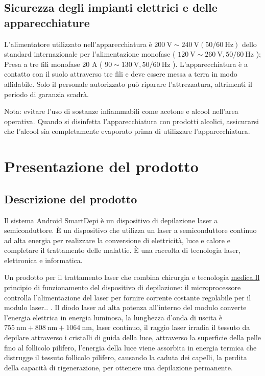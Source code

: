 \documentclass[10pt]{article}
\begin{document}
\subsection{Sicurezza degli impianti elettrici e delle apparecchiature}

L'alimentatore utilizzato nell'apparecchiatura è $200 \mathrm{~V} \sim 240 \mathrm{~V}(50 / 60 \mathrm{~Hz})$ dello standard internazionale per l'alimentazione monofase ( $120 \mathrm{~V} \sim 260 \mathrm{~V}, 50 / 60 \mathrm{~Hz}$ ); Presa a tre fili monofase 20 A ( $90 \sim 130 \mathrm{~V}, 50 / 60 \mathrm{~Hz}$ ). L'apparecchiatura è a contatto con il suolo attraverso tre fili e deve essere messa a terra in modo affidabile. Solo il personale autorizzato può riparare l'attrezzatura, altrimenti il periodo di garanzia scadrà.

Nota: evitare l'uso di sostanze infiammabili come acetone e alcool nell'area operativa. Quando si disinfetta l'apparecchiatura con prodotti alcolici, assicurarsi che l'alcool sia completamente evaporato prima di utilizzare l'apparecchiatura.

\section{Presentazione del prodotto}
\subsection{Descrizione del prodotto}
Il sistema Android SmartDepi è un dispositivo di depilazione laser a semiconduttore. È un dispositivo che utilizza un laser a semiconduttore continuo ad alta energia per realizzare la conversione di elettricità, luce e calore e completare il trattamento delle malattie. È una raccolta di tecnologia laser, elettronica e informatica.

Un prodotto per il trattamento laser che combina chirurgia e tecnologia \href{http://medica.Il}{medica.Il} principio di funzionamento del dispositivo di depilazione: il microprocessore controlla l'alimentazione del laser per fornire corrente costante regolabile per il modulo laser.. . Il diodo laser ad alta potenza all'interno del modulo converte l'energia elettrica in energia luminosa, la lunghezza d'onda di uscita è $755 \mathrm{~nm}+808 \mathrm{~nm}+1064 \mathrm{~nm}$, laser continuo, il raggio laser irradia il tessuto da depilare attraverso i cristalli di guida della luce, attraverso la superficie della pelle fino al follicolo pilifero, l'energia della luce viene assorbita in energia termica che distrugge il tessuto follicolo pilifero, causando la caduta dei capelli, la perdita della capacità di rigenerazione, per ottenere una depilazione permanente.
\end{document}
